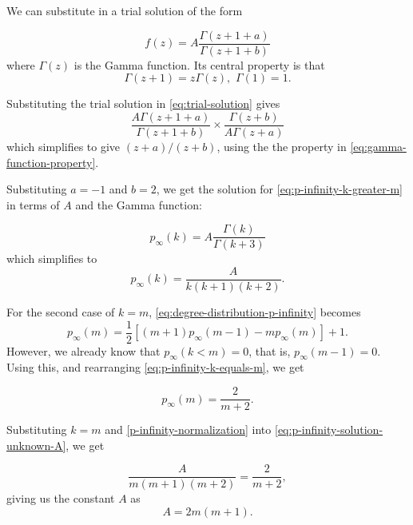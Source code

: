 We can substitute in a trial solution of the form

\begin{equation}
	f(z) = A \frac{\Gamma(z+1+a)}{\Gamma(z+1+b)}
	\label{eq:trial-solution}
\end{equation}
where $\Gamma(z)$ is the Gamma function. Its central property is that
\begin{equation}
	\Gamma(z+1) = z \Gamma(z),\,\, \Gamma(1) = 1.
	\label{eq:gamma-function-property}
\end{equation}

Substituting the trial solution in \autoref{eq:trial-solution} gives
\begin{equation}
	\frac{A \Gamma(z+1+a)}{\Gamma(z+1+b)} \times \frac{\Gamma(z+b)}{A \Gamma(z+a)}
\end{equation}
which simplifies to give $(z+a) / (z+b)$, using the the property in \autoref{eq:gamma-function-property}.

Substituting $a = -1$ and $b=2$, we get the solution for \autoref{eq:p-infinity-k-greater-m} in terms of $A$ and the Gamma function:

\begin{equation}
	p_{\infty}(k) = A \frac{\Gamma(k)}{\Gamma(k+3)}
\end{equation}
which simplifies to 
\begin{equation}
	p_{\infty}(k) = \frac{A}{k(k+1)(k+2)}.
	\label{eq:p-infinity-solution-unknown-A}
\end{equation}

For the second case of $k = m$, \autoref{eq:degree-distribution-p-infinity} becomes 
\begin{equation}
	p_{\infty}(m) = \frac{1}{2}[(m+1)p_{\infty}(m-1) - mp_{\infty}(m)] + 1. 
	\label{eq:p-infinity-k-equals-m}
\end{equation}
However, we already know that $p_{\infty}(k < m) = 0$, that is, $p_{\infty}(m-1) = 0$. Using this, and rearranging \autoref{eq:p-infinity-k-equals-m}, we get 

\begin{equation}
	p_{\infty}(m) = \frac{2}{m+2}.
	\label{p-infinity-normalization}
\end{equation}

Substituting $k = m$ and \autoref{p-infinity-normalization} into \autoref{eq:p-infinity-solution-unknown-A}, we get 

\begin{equation}
	\frac{A}{m(m+1)(m+2)} = \frac{2}{m+2}, 
\end{equation}
giving us the constant $A$ as
\begin{equation}
	A = 2m(m+1).
	\label{eq:normalization-constant}
\end{equation}

